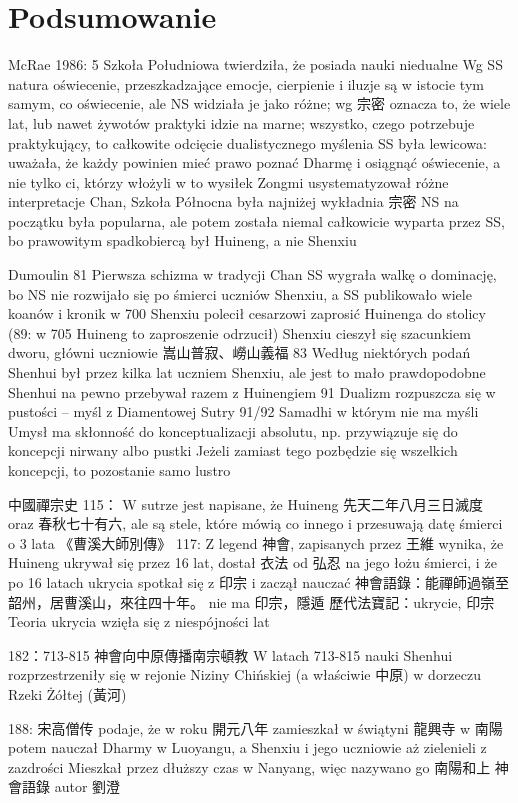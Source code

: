 \section{Podsumowanie}


McRae 1986: 5
Szkoła Południowa twierdziła, że posiada nauki niedualne
Wg SS natura oświecenie, przeszkadzające emocje, cierpienie i iluzje są w istocie tym samym, co oświecenie, ale NS widziała je jako różne; wg 宗密 oznacza to, że wiele lat, lub nawet żywotów praktyki idzie na marne; wszystko, czego potrzebuje praktykujący, to całkowite odcięcie dualistycznego myślenia
SS była lewicowa: uważała, że każdy powinien mieć prawo poznać Dharmę i osiągnąć oświecenie, a nie tylko ci, którzy włożyli w to wysiłek
Zongmi usystematyzował różne interpretacje Chan, Szkoła Północna była najniżej
wykładnia 宗密 NS na początku była popularna, ale potem została niemal całkowicie wyparta przez SS, bo prawowitym spadkobiercą był Huineng, a nie Shenxiu

Dumoulin 81
Pierwsza schizma w tradycji Chan
SS wygrała walkę o dominację, bo NS nie rozwijało się po śmierci uczniów Shenxiu, a SS publikowało wiele koanów i kronik
w 700 Shenxiu polecił cesarzowi zaprosić Huinenga do stolicy
(89: w 705 Huineng to zaproszenie odrzucił)
Shenxiu cieszył się szacunkiem dworu, główni uczniowie 嵩山普寂、嶗山義福
83
Według niektórych podań Shenhui był przez kilka lat uczniem Shenxiu, ale jest to mało prawdopodobne
Shenhui na pewno przebywał razem z Huinengiem
91 Dualizm rozpuszcza się w pustości -- myśl z Diamentowej Sutry
91/92 Samadhi w którym nie ma myśli
Umysł ma skłonność do konceptualizacji absolutu, np. przywiązuje się do koncepcji nirwany albo pustki
Jeżeli zamiast tego pozbędzie się wszelkich koncepcji, to pozostanie samo lustro

中國禪宗史 115：
W sutrze jest napisane, że Huineng 先天二年八月三日滅度 oraz 春秋七十有六, ale są stele, które mówią co innego i przesuwają datę śmierci o 3 lata
《曹溪大師別傳》
117: Z legend 神會, zapisanych przez 王維 wynika, że Huineng ukrywał się przez 16 lat, dostał 衣法 od 弘忍 na jego łożu śmierci, i że po 16 latach ukrycia spotkał się z 印宗 i zaczął nauczać
神會語錄：能禪師過嶺至韶州，居曹溪山，來往四十年。 nie ma 印宗，隱遁
歷代法寶記：ukrycie, 印宗
Teoria ukrycia wzięła się z niespójności lat

182：713-815 神會向中原傳播南宗頓教
W latach 713-815 nauki Shenhui rozprzestrzeniły się w rejonie Niziny Chińskiej (a właściwie 中原) w dorzeczu Rzeki Żółtej (黃河)

188: 宋高僧传 podaje, że w roku 開元八年 zamieszkał w świątyni 龍興寺 w 南陽
potem nauczał Dharmy w Luoyangu, a Shenxiu i jego uczniowie aż zielenieli z zazdrości
Mieszkał przez dłuższy czas w Nanyang, więc nazywano go 南陽和上
神會語錄 autor 劉澄

